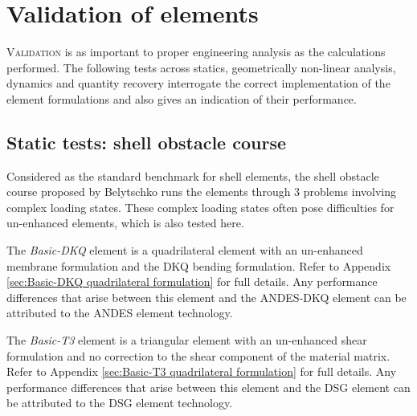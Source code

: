 


\chapter{Validation of elements}

\renewcommand{\Thema}{Validation of elements}

\lettrine[lines=2]{V}{alidation} is as important to proper engineering analysis as the calculations performed. The following tests across statics, geometrically non-linear analysis, dynamics and quantity recovery interrogate the correct implementation of the element formulations and also gives an indication of their performance. 

\section{Static tests: shell obstacle course}
\label{section:shell obstacle course}

Considered as the standard benchmark for shell elements, the shell obstacle course proposed by Belytschko \cite{Bel85} runs the elements through 3 problems involving complex loading states. These complex loading states often pose difficulties for un-enhanced elements, which is also tested here.

The \textit{Basic-DKQ} element is a quadrilateral element with an un-enhanced membrane formulation and the DKQ bending formulation. Refer to Appendix \ref{sec:Basic-DKQ quadrilateral formulation} for full details. Any performance differences that arise between this element and the ANDES-DKQ element can be attributed to the ANDES element technology.

The \textit{Basic-T3} element is a triangular element with an un-enhanced shear formulation and no correction to the shear component of the material matrix. Refer to Appendix \ref{sec:Basic-T3 quadrilateral formulation} for full details. Any performance differences that arise between this element and the DSG element can be attributed to the DSG element technology.

